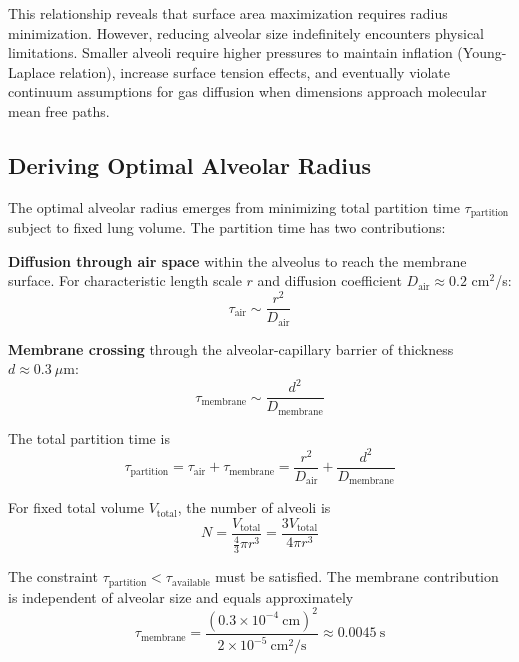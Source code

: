 \documentclass[10pt,twocolumn,a4paper]{article}
\theoremstyle{remark}
\begin{document}
This relationship reveals that surface area maximization requires radius minimization. However, reducing alveolar size indefinitely encounters physical limitations. Smaller alveoli require higher pressures to maintain inflation (Young-Laplace relation), increase surface tension effects, and eventually violate continuum assumptions for gas diffusion when dimensions approach molecular mean free paths.

\subsection{Deriving Optimal Alveolar Radius}

The optimal alveolar radius emerges from minimizing total partition time $\tau_{\mathrm{partition}}$ subject to fixed lung volume. The partition time has two contributions:

\textbf{Diffusion through air space} within the alveolus to reach the membrane surface. For characteristic length scale $r$ and diffusion coefficient $D_{\mathrm{air}} \approx 0.2$ cm$^{2}$/s:
\begin{equation}
\tau_{\mathrm{air}} \sim \frac{r^{2}}{D_{\mathrm{air}}}
\end{equation}

\textbf{Membrane crossing} through the alveolar-capillary barrier of thickness $d \approx 0.3~\mu$m:
\begin{equation}
\tau_{\mathrm{membrane}} \sim \frac{d^{2}}{D_{\mathrm{membrane}}}
\end{equation}

The total partition time is
\begin{equation}
\tau_{\mathrm{partition}} = \tau_{\mathrm{air}} + \tau_{\mathrm{membrane}} = \frac{r^{2}}{D_{\mathrm{air}}} + \frac{d^{2}}{D_{\mathrm{membrane}}}
\end{equation}

For fixed total volume $V_{\mathrm{total}}$, the number of alveoli is
\begin{equation}
N = \frac{V_{\mathrm{total}}}{\frac{4}{3}\pi r^{3}} = \frac{3V_{\mathrm{total}}}{4\pi r^{3}}
\end{equation}

The constraint $\tau_{\mathrm{partition}} < \tau_{\mathrm{available}}$ must be satisfied. The membrane contribution is independent of alveolar size and equals approximately
\begin{equation}
\tau_{\mathrm{membrane}} = \frac{(0.3 \times 10^{-4}~\mathrm{cm})^{2}}{2 \times 10^{-5}~\mathrm{cm}^{2}/\mathrm{s}} \approx 0.0045~\mathrm{s}
\end{equation}
\end{document}

